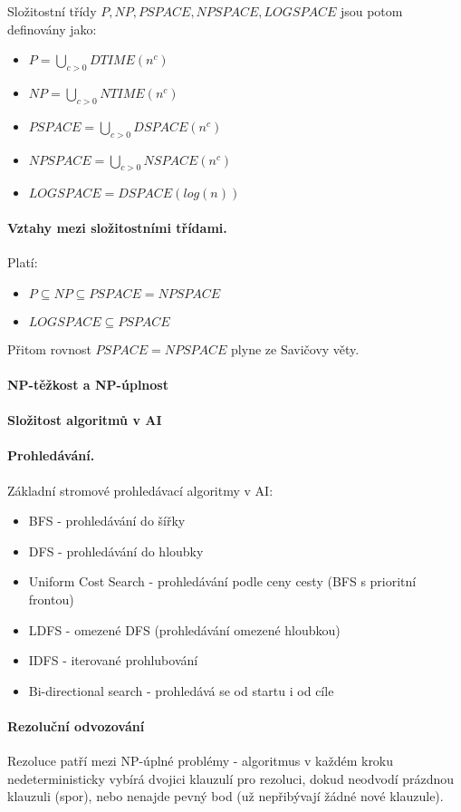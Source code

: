 \documentclass[a4paper]{article}      %
\begin{document}
Složitostní třídy $P,NP,PSPACE,NPSPACE,LOGSPACE$ jsou potom definovány jako:
\begin{itemize}
\item $P = \bigcup_{c > 0} DTIME(n^{c})$
\item $NP = \bigcup_{c > 0} NTIME(n^{c})$
\item $PSPACE = \bigcup_{c > 0} DSPACE(n^{c})$
\item $NPSPACE = \bigcup_{c > 0} NSPACE(n^{c})$
\item $LOGSPACE = DSPACE(log(n))$
\end{itemize}

\paragraph{Vztahy mezi složitostními třídami.}  Platí:
\begin{itemize}
\item $P \subseteq NP \subseteq PSPACE = NPSPACE$
\item $LOGSPACE \subseteq PSPACE$
\end{itemize}
Přitom rovnost $PSPACE = NPSPACE$ plyne ze Savičovy věty.

\paragraph{NP-těžkost a NP-úplnost}

\paragraph{Složitost algoritmů v AI}

\paragraph{Prohledávání.} Základní stromové prohledávací algoritmy v AI:
\begin{itemize}
\item BFS - prohledávání do šířky
\item DFS - prohledávání do hloubky
\item Uniform Cost Search - prohledávání podle ceny cesty (BFS s prioritní frontou)
\item LDFS - omezené DFS (prohledávání omezené hloubkou)
\item IDFS - iterované prohlubování
\item Bi-directional search - prohledává se od startu i od cíle
\end{itemize}

\paragraph{Rezoluční odvozování}
Rezoluce patří mezi NP-úplné problémy - algoritmus v každém kroku nedeterministicky vybírá dvojici klauzulí pro rezoluci, dokud neodvodí prázdnou klauzuli (spor), nebo nenajde pevný bod (už nepřibývají žádné nové klauzule). 
\end{document}
